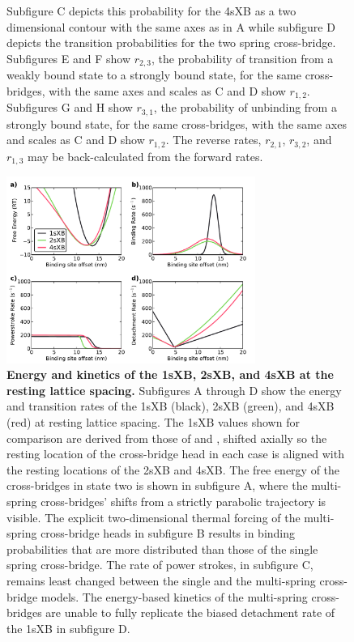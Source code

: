\documentclass[]{article}
\begin{document}
\begin{figure}[ht]
\begin{center}
{        Subfigure C depicts this probability for the 4sXB as a two dimensional contour with the same axes as in A while subfigure D depicts the transition probabilities for the two spring cross-bridge.
        Subfigures E and F show $r_{2,3}$, the probability of transition from a weakly bound state to a strongly bound state, for the same cross-bridges, with the same axes and scales as C and D show $r_{1,2}$.
        Subfigures G and H show $r_{3,1}$, the probability of unbinding from a strongly bound state, for the same cross-bridges, with the same axes and scales as C and D show $r_{1,2}$.
        The reverse rates, $r_{2,1}$, $r_{3,2}$, and $r_{1,3}$ may be back-calculated from the forward rates.
    }
    \end{center}
\end{figure}

\begin{figure}[ht]
    \begin{center}
    \includegraphics[width=3.2in]{../imgs/Figure3.pdf}
    \caption{
        \label{fig_kinetics_cuts}
        \textbf{Energy and kinetics of the 1sXB, 2sXB, and 4sXB at the resting lattice spacing.}
        Subfigures A through D show the energy and transition rates of the 1sXB (black), 2sXB (green), and 4sXB (red) at resting lattice spacing.
        The 1sXB values shown for comparison are derived from those of \citet{Daniel1998} and \citet{Tanner2007}, shifted axially so the resting location of the cross-bridge head in each case is aligned with the resting locations of the 2sXB and 4sXB\@. 
        The free energy of the cross-bridges in state two is shown in subfigure A, where the multi-spring cross-bridges' shifts from a strictly parabolic trajectory is visible.
        The explicit two-dimensional thermal forcing of the multi-spring cross-bridge heads in subfigure B results in binding probabilities that are more distributed than those of the single spring cross-bridge.
        The rate of power strokes, in subfigure C, remains least changed between the single and the multi-spring cross-bridge models.
        The energy-based kinetics of the multi-spring cross-bridges are unable to fully replicate the biased detachment rate of the 1sXB in subfigure D. 
    }
    \end{center}
\end{figure}
\end{document}
